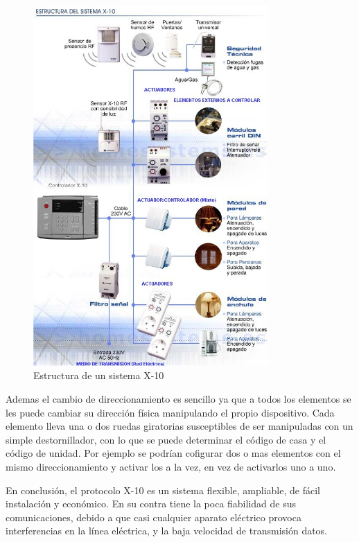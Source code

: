 \begin{figure}[htb]
	\centering
		\includegraphics[width=0.8\textwidth]{imagenes/estructura_x10.jpg}
	\caption{Estructura de un sistema X-10}
	\label{fig:estructura_x10}
\end{figure}





Ademas el cambio de direccionamiento es sencillo ya que a todos los
elementos se les puede cambiar su dirección física manipulando el propio
dispositivo. Cada elemento lleva una o dos ruedas giratorias susceptibles de
ser manipuladas con un simple destornillador, con lo que se puede determinar
el código de casa y el código de unidad. Por ejemplo se podrían cofigurar dos o
mas elementos con el mismo direccionamiento y activar los a la vez, en vez de
activarlos uno a uno.


En conclusión, el protocolo X-10 es un sistema flexible, ampliable, de
f\'acil instalación y económico. En su contra tiene la poca fiabilidad de sus
comunicaciones, debido a que casi cualquier aparato eléctrico provoca
interferencias en la línea eléctrica, y la baja velocidad de transmisión datos.
\clearpage
